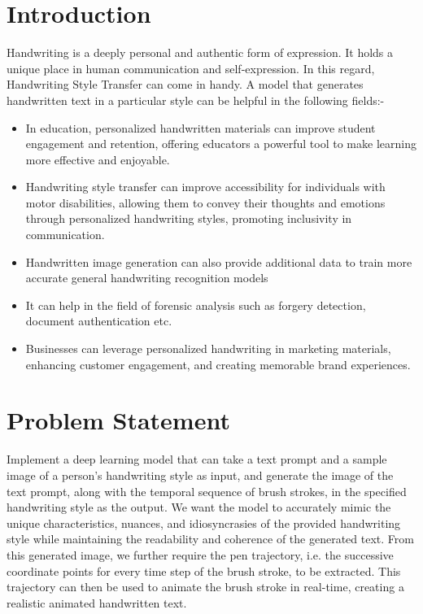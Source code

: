\documentclass[10pt,twocolumn,letterpaper]{article}
\begin{document}
\section{Introduction}
\label{sec:introduction}
Handwriting is a deeply personal and authentic form of expression. It holds a unique place in human communication and self-expression. In this regard, Handwriting Style Transfer can come in handy. A model that generates handwritten text in a particular style can be helpful in the following fields:-
\begin{itemize}
    \item In education, personalized handwritten materials can improve student engagement and retention, offering educators a powerful tool to make learning more effective and enjoyable.
    \item Handwriting style transfer can improve accessibility for individuals with motor disabilities, allowing them to convey their thoughts and emotions through personalized handwriting styles, promoting inclusivity in communication.
    \item Handwritten image generation can also provide additional data to train more accurate general handwriting recognition models 
    \item It can help in the field of forensic analysis such as forgery detection, document authentication etc.
    \item Businesses can leverage personalized handwriting in marketing materials, enhancing customer engagement, and creating memorable brand experiences.
\end{itemize}

\section{Problem Statement}
\label{sec: PS}
Implement a deep learning model that can take a text prompt and a sample image of a person's handwriting style as input, and generate the image of the text prompt, along with the temporal sequence of brush strokes, in the specified handwriting style as the output. We want the model to accurately mimic the unique characteristics, nuances, and idiosyncrasies of the provided handwriting style while maintaining the readability and coherence of the generated text. From this generated image, we further require the pen trajectory, i.e. the successive coordinate points for every time step of the brush stroke, to be extracted. This trajectory can then be used to animate the brush stroke in real-time, creating a realistic animated handwritten text.  
\end{document}
